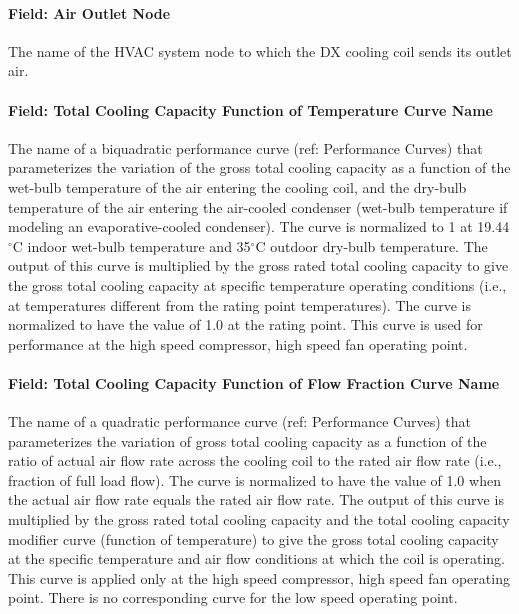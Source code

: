 \paragraph{Field: Air Outlet Node}\label{field-air-outlet-node}

The name of the HVAC system node to which the DX cooling coil sends its outlet air.

\paragraph{Field: Total Cooling Capacity Function of Temperature Curve Name}\label{field-total-cooling-capacity-function-of-temperature-curve-name-1}

The name of a biquadratic performance curve (ref: Performance Curves) that parameterizes the variation of the gross total cooling capacity as a function of the wet-bulb temperature of the air entering the cooling coil, and the dry-bulb temperature of the air entering the air-cooled condenser (wet-bulb temperature if modeling an evaporative-cooled condenser). The curve is normalized to 1 at 19.44$^\circ$C indoor wet-bulb temperature and 35$^\circ$C outdoor dry-bulb temperature. The output of this curve is multiplied by the gross rated total cooling capacity to give the gross total cooling capacity at specific temperature operating conditions (i.e., at temperatures different from the rating point temperatures). The curve is normalized to have the value of 1.0 at the rating point. This curve is used for performance at the high speed compressor, high speed fan operating point.

\paragraph{Field: Total Cooling Capacity Function of Flow Fraction Curve Name}\label{field-total-cooling-capacity-function-of-flow-fraction-curve-name-1}

The name of a quadratic performance curve (ref: Performance Curves) that parameterizes the variation of gross total cooling capacity as a function of the ratio of actual air flow rate across the cooling coil to the rated air flow rate (i.e., fraction of full load flow). The curve is normalized to have the value of 1.0 when the actual air flow rate equals the rated air flow rate. The output of this curve is multiplied by the gross rated total cooling capacity and the total cooling capacity modifier curve (function of temperature) to give the gross total cooling capacity at the specific temperature and air flow conditions at which the coil is operating. This curve is applied only at the high speed compressor, high speed fan operating point. There is no corresponding curve for the low speed operating point.

